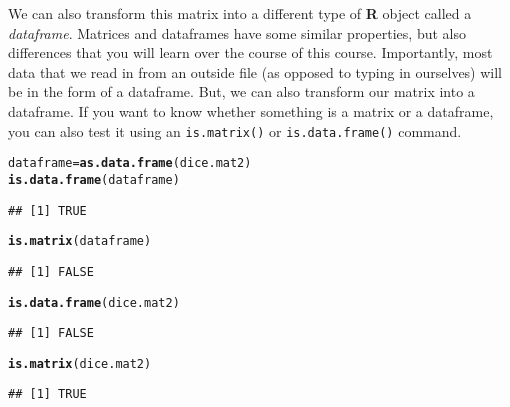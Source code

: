 \documentclass[12pt]{article}\usepackage[]{graphicx}\usepackage[]{color}
\makeatletter
\newcommand{\hlstd}[1]{\textcolor[rgb]{0.345,0.345,0.345}{#1}}%
\newcommand{\hlkwb}[1]{\textcolor[rgb]{0.69,0.353,0.396}{#1}}%
\newcommand{\hlkwd}[1]{\textcolor[rgb]{0.737,0.353,0.396}{\textbf{#1}}}%
\newenvironment{kframe}{%
 \def\at@end@of@kframe{}%
 \ifinner\ifhmode%
  \def\at@end@of@kframe{\end{minipage}}%
  \begin{minipage}{\columnwidth}%
 \fi\fi%
 \def\FrameCommand##1{\hskip\@totalleftmargin \hskip-\fboxsep
 \colorbox{shadecolor}{##1}\hskip-\fboxsep
     \hskip-\linewidth \hskip-\@totalleftmargin \hskip\columnwidth}%
 \MakeFramed {\advance\hsize-\width
   \@totalleftmargin\z@ \linewidth\hsize
   \@setminipage}}%
 {\par\unskip\endMakeFramed%
 \at@end@of@kframe}
\newenvironment{knitrout}{}{} %
\makeatother
\begin{document}
We can also transform this matrix into a different type of \textbf{R} object called a \emph{dataframe}. Matrices and dataframes have some similar properties, but also differences that you will learn over the course of this course. Importantly, most data that we read in from an outside file (as opposed to typing in ourselves) will be in the form of a dataframe. But, we can also transform our matrix into a dataframe. If you want to know whether something is a matrix or a dataframe, you can also test it using an \verb|is.matrix()| or \verb|is.data.frame()| command.
\begin{knitrout}
\color{fgcolor}\begin{kframe}
\begin{alltt}
\hlstd{dataframe} \hlkwb{=} \hlkwd{as.data.frame}\hlstd{(dice.mat2)}
\hlkwd{is.data.frame}\hlstd{(dataframe)}
\end{alltt}
\begin{verbatim}
## [1] TRUE
\end{verbatim}
\begin{alltt}
\hlkwd{is.matrix}\hlstd{(dataframe)}
\end{alltt}
\begin{verbatim}
## [1] FALSE
\end{verbatim}
\begin{alltt}
\hlkwd{is.data.frame}\hlstd{(dice.mat2)}
\end{alltt}
\begin{verbatim}
## [1] FALSE
\end{verbatim}
\begin{alltt}
\hlkwd{is.matrix}\hlstd{(dice.mat2)}
\end{alltt}
\begin{verbatim}
## [1] TRUE
\end{verbatim}
\end{kframe}
\end{knitrout}
\end{document}
